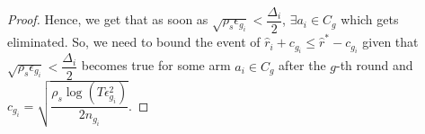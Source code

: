 \begin{proof}
\newline Hence, we get that as soon as $\sqrt{\rho_{s}\epsilon_{g_{i}}}<\dfrac{\Delta_{i}}{2}$, $\exists a_{i}\in C_{g}$ which gets eliminated.
\newline So, we need to bound the event of $\hat{r}_{i}+c_{g_{i}}\leq \hat{r}^{*}-c_{g_{i}}$ given that $\sqrt{\rho_{s}\epsilon_{g_{i}}}<\dfrac{\Delta_{i}}{2}$ becomes true for some arm $a_{i}\in C_{g}$ after the $g$-th round and $c_{g_{i}}=\sqrt{\dfrac{\rho_{s} \log (T\epsilon_{g_{i}}^{2})}{2 n_{g_{i}}}}$.


\end{proof}
